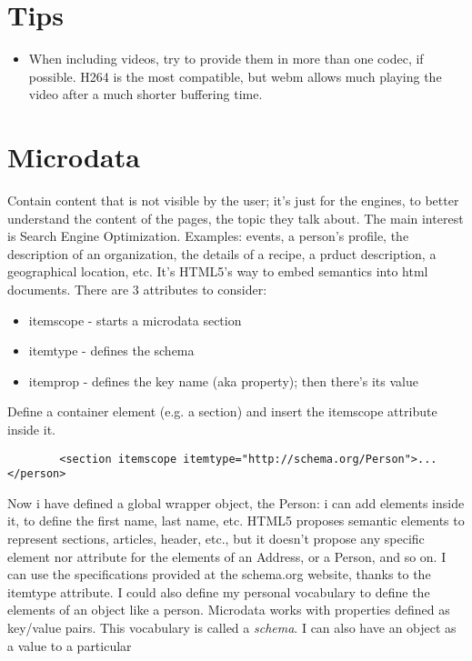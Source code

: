 \documentclass[a4paper,11pt]{book}
\begin{document}
\chapter{Tips}
\begin{itemize}
\item When including videos, try to provide them in more than one codec, if possible. H264 is the most compatible,
	but webm allows much playing the video after a much shorter buffering time.
\end{itemize}

\chapter{Microdata}
    Contain content that is not visible by the user; it's just for the engines, to better understand the content
    of the pages, the topic they talk about. The main interest is Search Engine Optimization.
    Examples: events, a person's profile, the description of an organization, the details of a recipe, a prduct
    description, a geographical location, etc. It's HTML5's way to embed semantics into html documents.
    There are 3 attributes to consider:
    \begin{itemize}
        \item itemscope - starts a microdata section
        \item itemtype  - defines the schema
        \item itemprop  - defines the key name (aka property); then there's its value
    \end{itemize}
    Define a container element (e.g. a section) and insert the itemscope attribute inside it.
    \begin{verbatim}
        <section itemscope itemtype="http://schema.org/Person">...</person>
    \end{verbatim}
    Now i have defined a global wrapper object, the Person: i can add elements inside it, to define the first name,
    last name, etc. HTML5 proposes semantic elements to represent sections, articles, header, etc., but it doesn't
    propose any specific element nor attribute for the elements of an Address, or a Person, and so on. I can use
    the specifications provided at the schema.org website, thanks to the itemtype attribute. I could also define
    my personal vocabulary to define the elements of an object like a person. Microdata works with properties defined
    as key/value pairs. This vocabulary is called a \emph{schema}. I can also have an object as a value to a particular
\end{document}
